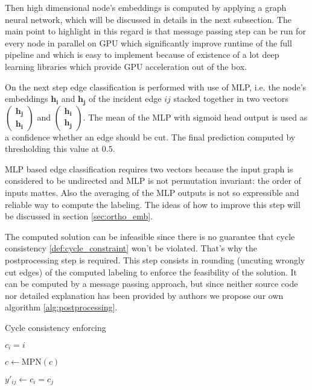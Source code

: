 \documentclass[10pt, twocolumn, a4paper]{article}
\theoremstyle{definition}
\begin{document}
Then high dimensional node's embeddings is computed by applying a graph neural network, which will be
discussed in details in the next subsection. The main point to highlight in this regard is that
message passing step  can be run for every node in parallel on GPU which significantly improve runtime of the
full pipeline and which is easy to implement because of existence of a lot deep learning libraries
which provide GPU acceleration out of the box.

On the next step edge classification is performed with use of MLP, i.e. the node's embeddings $\mathbf{h_i}$ and
$\mathbf{h_j}$ of the incident edge $ij$ stacked together in two vectors
$\left( \substack{\mathbf{h_j} \\ \mathbf{h_i}} \right)$ and
$\left( \substack{\mathbf{h_i} \\ \mathbf{h_j}} \right)$. The mean of the MLP with sigmoid head
output is used as a confidence whether an edge should be cut. The final prediction computed by thresholding
this value at $0.5$.

MLP based edge classification requires two vectors because the input graph is considered to be undirected and
MLP is not permutation invariant: the order of inputs
mattes. Also the averaging of the MLP outputs is not so expressible and reliable way to compute the labeling.
The ideas of how to improve this step will be discussed in section \ref{sec:ortho_emb}.

The computed solution can be infeasible since there is no guarantee that cycle consistency \eqref{def:cycle_constraint} won't be
violated. That's why the postprocessing step is required. This step consists in rounding (uncuting wrongly cut edges) of the computed
labeling to enforce the feasibility of the solution. It can be computed by a message passing approach, but since
neither source code nor detailed explanation has been provided by authors we propose our own algorithm \ref{alg:postprocessing}.

\begin{algorithm}[h]
    \caption{Cycle consistency enforcing} \label{alg:postprocessing}

    {
        $c_i = i$ 
    }

    {
        $c \gets \text{MPN}(c)$ 
    }

    {
    $y'_{ij} \gets c_i = c_j$ \;
    }

\end{algorithm}
\end{document}
